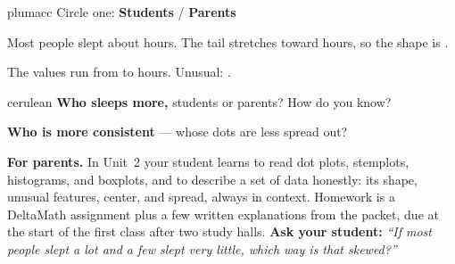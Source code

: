 \documentclass[12pt]{article}
\begin{document}
\vspace{0.08in}
\boxguard
\begin{scenariobox}{plumacc}
Circle one: \quad \textbf{Students} \quad / \quad \textbf{Parents}\par\vspace{10pt}
Most people slept about \blank{1.6cm} hours. The tail stretches toward \blank{1.8cm} hours,
so the shape is \blank{3.2cm}.\par\vspace{10pt}
The values run from \blank{1.4cm} to \blank{1.4cm} hours. Unusual: \blank{3.4cm}.
\end{scenariobox}

\vspace{0.08in}
\boxguard
\begin{scenariobox}{cerulean}
\textbf{Who sleeps more,} students or parents? \blank{2.6cm} How do you know?\par\vspace{4pt}
\writeline\par\vspace{8pt}
\textbf{Who is more consistent} --- whose dots are less spread out? \blank{2.6cm}\par\vspace{4pt}
\writeline
\end{scenariobox}

\vspace{0.08in}
\begin{remindbox}
\textbf{For parents.} In Unit~2 your student learns to read dot plots, stemplots, histograms,
and boxplots, and to describe a set of data honestly: its shape, unusual features, center, and
spread, always in context. Homework is a DeltaMath assignment plus a few written explanations
from the packet, due at the start of the first class after two study halls. \textbf{Ask your
student:} \emph{``If most people slept a lot and a few slept very little, which way is that
skewed?''}
\end{remindbox}
\end{document}
